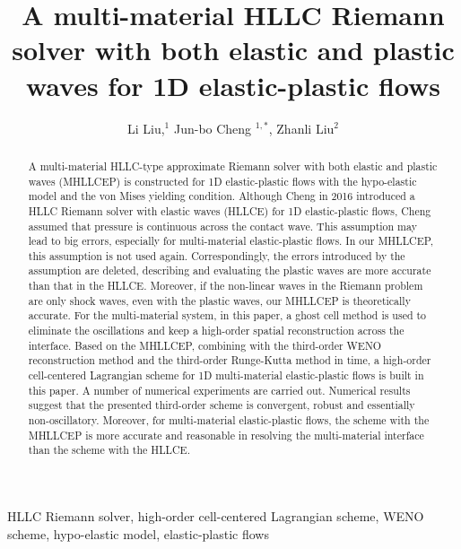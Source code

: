 \documentclass[review]{elsarticle}
\begin{document}
\begin{frontmatter}

\title{A multi-material HLLC Riemann solver with both elastic and plastic waves for 1D  elastic-plastic flows}

\author{Li Liu,$^1$ Jun-bo Cheng $^{1,*}$, Zhanli Liu$^2$}


\address{$^1$  Institute of Applied Physics and Computational Mathematics, Beijing 100094, China }
\address{$^2$  Applied Mechanics Laboratory, Department of Engineering Mechanics, School of Aerospace, Tsinghua University, Beijing, China }

\begin{abstract}
  A multi-material HLLC-type  approximate Riemann solver with both elastic and plastic waves (MHLLCEP) is constructed for 1D elastic-plastic flows with the  hypo-elastic model and the von Mises yielding condition. Although Cheng in 2016 \cite{cheng2016harten} introduced a HLLC Riemann solver with elastic waves (HLLCE) for 1D elastic-plastic flows, Cheng assumed that pressure is continuous across the contact wave. This assumption may lead to big errors, especially for multi-material elastic-plastic flows. In our MHLLCEP, this assumption is not used again. Correspondingly, the errors introduced by the assumption are deleted, describing and evaluating the plastic waves are more accurate than that in the HLLCE. Moreover, if the non-linear waves in the Riemann problem are only shock waves, even with the plastic waves, our MHLLCEP is theoretically accurate. For  the multi-material system, in this paper, a ghost cell method is used to eliminate the  oscillations  and keep a high-order spatial reconstruction across the interface. Based on the MHLLCEP, combining with the third-order WENO reconstruction method and the third-order Runge-Kutta method in time, a high-order cell-centered Lagrangian scheme for 1D multi-material elastic-plastic flows is built in this paper. A number of numerical experiments are carried out. Numerical results suggest  that the presented third-order scheme is convergent, robust and essentially non-oscillatory. Moreover, for multi-material elastic-plastic flows, the scheme with  the MHLLCEP is more accurate and reasonable in resolving the multi-material interface than the scheme with the  HLLCE.
\end{abstract}

\begin{keyword}
  HLLC Riemann solver, high-order cell-centered Lagrangian scheme,  WENO scheme,  hypo-elastic model, elastic-plastic flows
\end{keyword}

\end{frontmatter}
\end{document}
